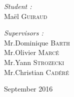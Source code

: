 \documentclass[a4paper,10pt]{report}
\newcommand{\reportauthor}{Maël \textsc{Guiraud }} %
\begin{document}
\begin{titlepage}
\begin{center}
\begin{minipage}[t]{0.3\textwidth}
  \begin{flushleft} \large
    \emph{Student :}\\
    \reportauthor 
  \end{flushleft}
\end{minipage}
\begin{minipage}[t]{0.6\textwidth}
  \begin{flushright} \large
    \emph{Supervisors :} \\
    Mr.Dominique \textsc{Barth} \\
    Mr.Olivier \textsc{Marcé} \\
    Mr.Yann \textsc{Strozecki} \\
    Mr.Christian \textsc{Cadéré} \\

  \end{flushright}
\end{minipage}

\vfill

{\large September 2016}

\end{center}

\end{titlepage}

\newpage
\null
\newpage
\tableofcontents
\end{document}
